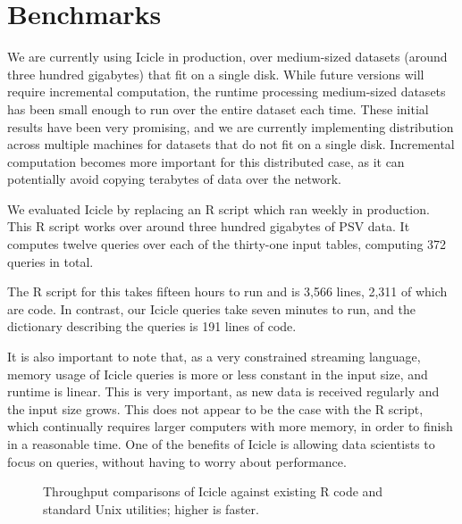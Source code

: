 \section{Benchmarks}
\label{s:Benchmarks}

We are currently using Icicle in production, over medium-sized datasets (around three hundred gigabytes) that fit on a single disk.
While future versions will require incremental computation, the runtime processing medium-sized datasets has been small enough to run over the entire dataset each time.
These initial results have been very promising, and we are currently implementing distribution across multiple machines for datasets that do not fit on a single disk.
Incremental computation becomes more important for this distributed case, as it can potentially avoid copying terabytes of data over the network.

We evaluated Icicle by replacing an R script which ran weekly in production.
This R script works over around three hundred gigabytes of PSV data.
It computes twelve queries over each of the thirty-one input tables, computing 372 queries in total.

The R script for this takes fifteen hours to run and is 3,566 lines, 2,311 of which are code.
In contrast, our Icicle queries take seven minutes to run, and the dictionary describing the queries is 191 lines of code.

It is also important to note that, as a very constrained streaming language, memory usage of Icicle queries is more or less constant in the input size, and runtime is linear.
This is very important, as new data is received regularly and the input size grows.
This does not appear to be the case with the R script, which continually requires larger computers with more memory, in order to finish in a reasonable time.
One of the benefits of Icicle is allowing data scientists to focus on queries, without having to worry about performance.

\begin{figure}


\caption{Throughput comparisons of Icicle against existing R code and standard Unix utilities; higher is faster.}
\label{fig:bench:other}
\end{figure}


